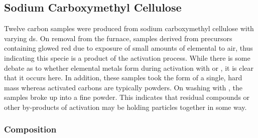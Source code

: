 \newpage
\subsection{Sodium Carboxymethyl Cellulose}
\label{ss:NC}

Twelve carbon samples were produced from sodium carboxymethyl cellulose with varying \acrshort{ds}. On removal from the furnace, samples derived from precursors containing  glowed red due to exposure of small amounts of elemental  to air, thus indicating this specie is a product of the activation process. While there is some debate as to whether elemental metals form during activation with  or ,\citep{Blankenship2022Modulating, Sevilla2014Energy, LozanoCastello2007Carbon, Kelemen1983interaction, Xue2003Formation} it is clear that it occurs here. In addition, these samples took the form of a single, hard mass whereas activated carbons are typically powders. On washing with , the samples broke up into a fine powder. This indicates that residual  compounds or other by-products of activation may be holding particles together in some way.

\subsubsection{Composition}
\label{sss:NC_composition}

